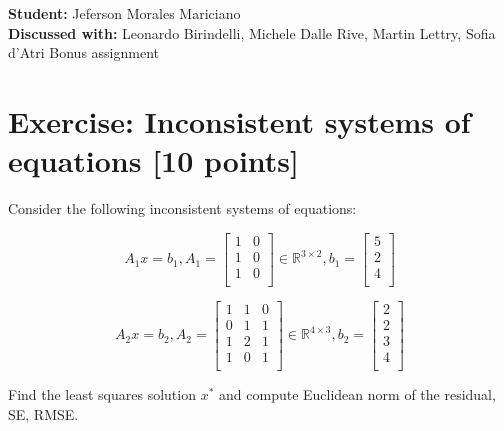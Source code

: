 \documentclass[unicode,11pt,a4paper,oneside,numbers=endperiod,openany]{scrartcl}
\begin{document}
\setassignment
{}

{\textbf{Student:} Jeferson Morales Mariciano\\}
{\textbf{Discussed with:} Leonardo Birindelli, Michele Dalle Rive, Martin Lettry, Sofia d'Atri}
{Bonus assignment}{}
\newline

\assignmentpolicy


\newpage

\section{Exercise: Inconsistent systems of equations [10 points]}
\label{sec:ex1}
Consider the following inconsistent systems of equations:

\begin{equation}
    A_1x = b_1,
    A_1 =
    \begin{bmatrix} 1 & 0 \\1 & 0 \\1 & 0 \\ \end{bmatrix}
    \in \mathbb{R}^{3 \times 2},
    b_1 =
    \begin{bmatrix} 5 \\ 2\\ 4 \\ \end{bmatrix}
\end{equation}

\begin{equation}
    A_2x = b_2,
    A_2 =
    \begin{bmatrix} 1 & 1 & 0 \\0 & 1 & 1 \\1 & 2 & 1 \\1 & 0 & 1 \\ \end{bmatrix}
    \in \mathbb{R}^{4 \times 3},
    b_2 =
    \begin{bmatrix} 2 \\ 2\\ 3\\ 4\\ \end{bmatrix}
\end{equation}

Find the least squares solution $x^*$ and compute Euclidean norm of the residual, SE, RMSE.
\end{document}
